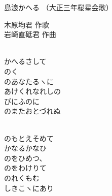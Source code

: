 \documentclass[10pt,b5j]{tarticle} %
\begin{document}
\begin{minipage}[c]{0.7\hsize} %
    \begin{center}
        {\LARGE
            島浪かへる %
        }
        {\small 
            （大正三年桜星会歌） %
        }
    \end{center}
\end{minipage}
\begin{minipage}[c]{0.3\hsize} %
    \begin{flushright} %
        木原均君 作歌\\岩崎直砥君 作曲 %
    \end{flushright}
\end{minipage}

\vspace{1.5em} %
\newcommand{\linespace}{0.5em} %
\newcommand{\blocksize}{0.5\hsize} %
\newcommand{\itemmargin}{6em} %
\begin{enumerate} %
    \setlength{\itemindent}{\itemmargin} %
    \begin{minipage}[c]{\blocksize}
    
        \vspace{\linespace}
        \item~\\
        かへるさして\\
        のく\\
        のあなたるヽに\\
        あけくれなれしの\\
        びにふのに\\
        のまたおとづれぬ
        
        \vspace{\linespace}
        \item~\\
        のもとえそめて\\
        かなるかなひ\\
        のをひめつ、\\
        のをわけりて\\
        のれくもむ\\
        しきこヽにあり
    
    \end{minipage}
\end{enumerate} %
\end{document}
